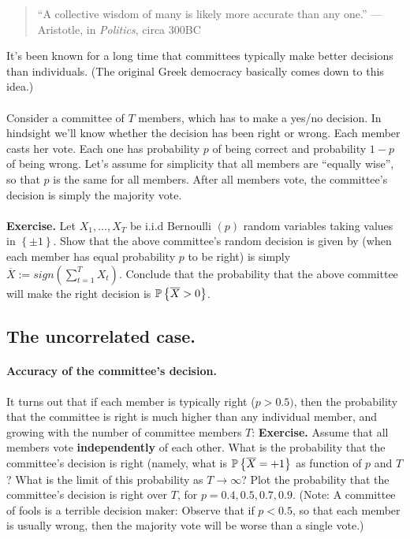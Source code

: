 \begin{quote}
  ``A collective wisdom of many is likely more accurate than any one.'' —
Aristotle, in {\em Politics}, circa 300BC
\end{quote}
%
\noindent It's been known for a long time that committees typically make better decisions
than individuals. (The original Greek democracy basically comes down to this
idea.) 
\\~\\
Consider a committee of $T$ members, which has to make a yes/no decision. In
hindsight we'll know whether the decision has been right or wrong.
Each member casts her vote. Each one has probability $p$ of being correct and
probability $1-p$ of being wrong. Let's assume for simplicity that all members
are ``equally wise'', so that $p$ is the same for all members. After all members
vote, the committee's decision is simply the majority vote.
\\~\\
{\bf Exercise.} Let $X_1,\ldots, X_T$ be i.i.d Bernoulli $(p)$ random variables
taking values in $\left\{ \pm 1 \right\}$. Show that the 
above committee's random decision is given by  (when each member has equal
probability $p$ to be right) is simply 
$\overline{X}:= sign(\sum_{t=1}^T X_t)$. Conclude that the probability that the
above committee will make the right decision is $\mathbb{P}\left\{ \overline{X}>0
\right\}$.

\subsection{The uncorrelated case.}

\paragraph{Accuracy of the committee's decision.} 
It turns out that if each member is typically right ($p>0.5)$, 
then the probability that the committee is right is much higher than any
individual member, and growing with the number of committee members $T$:
%
{\bf Exercise.} Assume that all members vote {\bf independently} of each other.
What is the probability that the committee's decision is right (namely, what is
  $\mathbb{P}\left\{ \overline{X}=+1 \right\}$ as function of
$p$ and $T$? What is the limit of this probability as $T\to\infty$? Plot the
probability that the committee's decision is right over $T$, for $p=0.4,0.5,0.7,0.9$. 
(Note: A committee of fools is a terrible decision maker: Observe that if
  $p<0.5$, so that each member is usually wrong, then the majority vote
will be worse than a single vote.) 

